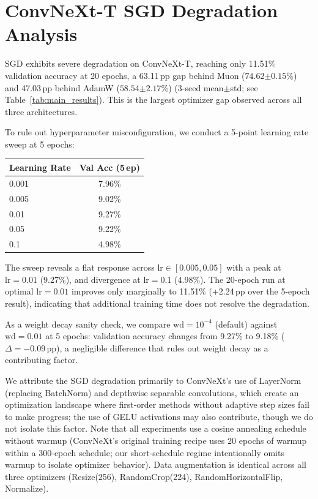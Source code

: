 \section{ConvNeXt-T SGD Degradation Analysis}
\label{sec:convnext_sgd_analysis}
SGD exhibits severe degradation on ConvNeXt-T, reaching only 11.51\% validation accuracy at 20 epochs, a 63.11\,pp gap behind Muon ($74.62{\scriptstyle\pm 0.15}$\%) and 47.03\,pp behind AdamW ($58.54{\scriptstyle\pm 2.17}$\%) (3-seed mean$\pm$std; see Table~\ref{tab:main_results}). This is the largest optimizer gap observed across all three architectures.

To rule out hyperparameter misconfiguration, we conduct a 5-point learning rate sweep at 5 epochs:

\begin{center}
\begin{tabular}{lc}
\toprule
Learning Rate & Val Acc (5\,ep) \\
\midrule
0.001 & 7.96\% \\
0.005 & 9.02\% \\
0.01 & 9.27\% \\
0.05 & 9.22\% \\
0.1 & 4.98\% \\
\bottomrule
\end{tabular}
\end{center}

The sweep reveals a flat response across $\mathrm{lr} \in [0.005, 0.05]$ with a peak at $\mathrm{lr}=0.01$ (9.27\%), and divergence at $\mathrm{lr}=0.1$ (4.98\%). The 20-epoch run at optimal $\mathrm{lr}=0.01$ improves only marginally to 11.51\% (+2.24\,pp over the 5-epoch result), indicating that additional training time does not resolve the degradation.

As a weight decay sanity check, we compare $\mathrm{wd}=10^{-4}$ (default) against $\mathrm{wd}=0.01$ at 5 epochs: validation accuracy changes from 9.27\% to 9.18\% ($\Delta = -0.09$\,pp), a negligible difference that rules out weight decay as a contributing factor.

We attribute the SGD degradation primarily to ConvNeXt's use of LayerNorm (replacing BatchNorm) and depthwise separable convolutions, which create an optimization landscape where first-order methods without adaptive step sizes fail to make progress; the use of GELU activations may also contribute, though we do not isolate this factor. Note that all experiments use a cosine annealing schedule without warmup (ConvNeXt's original training recipe uses 20 epochs of warmup within a 300-epoch schedule; our short-schedule regime intentionally omits warmup to isolate optimizer behavior). Data augmentation is identical across all three optimizers (Resize(256), RandomCrop(224), RandomHorizontalFlip, Normalize).
